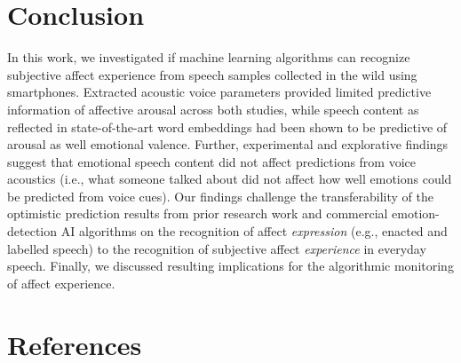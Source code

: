 \documentclass[
  english,
  man,floatsintext]{apa6}
\begin{document}
\hypertarget{conclusion}{%
\section{Conclusion}\label{conclusion}}

In this work, we investigated if machine learning algorithms can recognize subjective affect experience from speech samples collected in the wild using smartphones. Extracted acoustic voice parameters provided limited predictive information of affective arousal across both studies, while speech content as reflected in state-of-the-art word embeddings had been shown to be predictive of arousal as well emotional valence. Further, experimental and explorative findings suggest that emotional speech content did not affect predictions from voice acoustics (i.e., what someone talked about did not affect how well emotions could be predicted from voice cues). Our findings challenge the transferability of the optimistic prediction results from prior research work and commercial emotion-detection AI algorithms on the recognition of affect \emph{expression} (e.g., enacted and labelled speech) to the recognition of subjective affect \emph{experience} in everyday speech. Finally, we discussed resulting implications for the algorithmic monitoring of affect experience.

\newpage

\hypertarget{references}{%
\section{References}\label{references}}
\end{document}
